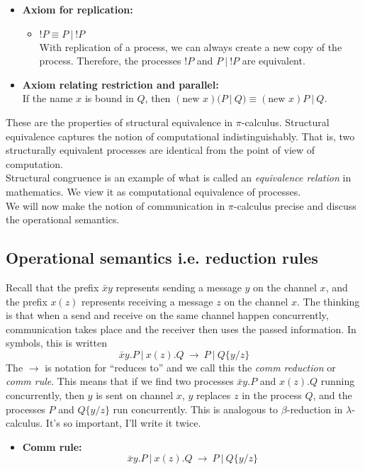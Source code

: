 \documentclass[12pt]{article}
\numberwithin{equation}{section}
\begin{document}
\begin{itemize}
\item \textbf{Axiom for replication:} 
\begin{itemize}
\item $!P \equiv P \ | \ !P$ \\
With replication of a process, we can always create a new copy of the process. Therefore, the processes $!P$ and $P \ | \ !P$ are equivalent.
\end{itemize}

\item \textbf{Axiom relating restriction and parallel:} \\
If the name $x$ is bound in $Q$, then $(\text{new } x)(P \ | \ Q) \equiv (\text{new } x)P \ | \ Q$.
\end{itemize}

These are the properties of structural equivalence in $\pi$-calculus. Structural equivalence captures the notion of computational indistinguishably. That is, two structurally equivalent processes are identical from the point of view of computation. \\

Structural congruence is an example of what is called an \emph{equivalence relation} in mathematics. We view it as computational equivalence of processes. \\

We will now make the notion of communication in $\pi$-calculus precise and discuss the operational semantics.

\subsection{Operational semantics i.e. reduction rules}
Recall that the prefix $\bar{ x} y$ represents sending a message $y$ on the channel $x$, and the prefix $x(z)$ represents receiving a message $z$ on the channel $x$. The thinking is that when a send and receive on the same channel happen concurrently, communication takes place and the receiver then uses the passed information. In symbols, this is written
\[ \bar{ x} y .P \ | \ x(z).Q \ \rightarrow \ P \ | \ Q \{ y/z \} \]
The $\rightarrow$ is notation for ``reduces to'' and we call this the \emph{comm reduction} or \emph{comm rule}. This means that if we find two processes $\bar{x} y.P$ and $x(z).Q$ running concurrently, then $y$ is sent on channel $x$, $y$ replaces $z$ in the process $Q$, and the processes $P$ and $Q \{ y / z \}$ run concurrently. This is analogous to $\beta$-reduction in $\lambda$-calculus. It's so important, I'll write it twice.
\begin{itemize}
\item \textbf{Comm rule:}
\[ \bar{ x} y.P \ | \ x(z).Q \ \rightarrow \ P \ | \ Q \{ y/z \} \]
\end{itemize}
\end{document}
